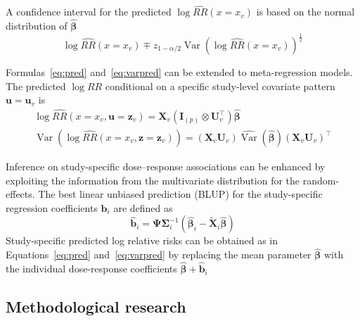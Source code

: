 \documentclass[11pt,a4paper,twoside,openany]{book}\usepackage{knitr}
\DeclareMathOperator{\Var}{Var}
\begin{document}
{\noindent A confidence interval for the predicted $\log \widehat{RR}(x = x_v)$ is based on the normal distribution of $\boldsymbol{\hat \beta}$
\begin{equation*}
\log \widehat{RR}(x = x_v) \mp z_{1- \alpha/2} \Var \left(\log \widehat{RR}(x = x_v) \right)^{\frac{1}{2}}
\label{eq:pred_ci}
\end{equation*}

\noindent Formulas~\ref{eq:pred} and~\ref{eq:varpred} can be extended to meta-regression models. The predicted $\log RR$ conditional on a specific study-level covariate pattern $\mathbf{u} = \mathbf{u}_v$ is
\begin{align}
\log \widehat{RR}\left(x = x_v, \mathbf{u} = \mathbf{z}_v  \right)= \mathbf{X}_v \left(\mathbf{I}_{(p)} \otimes \mathbf{U}_v^\top \right) \boldsymbol{\hat \beta}  \label{eq:pred_mr} \\
\Var \left(\log \widehat{RR}\left(x = x_v, \mathbf{z}= \mathbf{z}_v \right) \right) = \left( \mathbf{X}_v \mathbf{U}_v\right) \widehat{\Var} \left( \boldsymbol{\hat \beta} \right) \left( \mathbf{X}_v \mathbf{U}_v\right)^\top \label{eq:varpred_mr}
\end{align}

Inference on study-specific dose--response associations can be enhanced by exploiting the information from the multivariate distribution for the random-effects. The best linear unbiased prediction (BLUP) for the study-specific regression coefficients $\mathbf{b}_i$ are defined as
\begin{equation}
\boldsymbol{\hat b}_i = \boldsymbol{\Psi} \boldsymbol{\Sigma}_i^{-1} \left(\boldsymbol{\hat \beta}_i - \widetilde{\mathbf{X}}_i \boldsymbol{\hat \beta} \right)
\label{eq:blup_ts}
\end{equation}
\noindent Study-specific predicted log relative risks can be obtained as in Equations~\ref{eq:pred} and~\ref{eq:varpred} by replacing the mean parameter $\boldsymbol{\hat \beta}$ with the individual dose-response coefficients $\boldsymbol{\hat \beta} + \boldsymbol{\hat b}_i$ 


\subsection{Methodological research}

}
\end{document}
